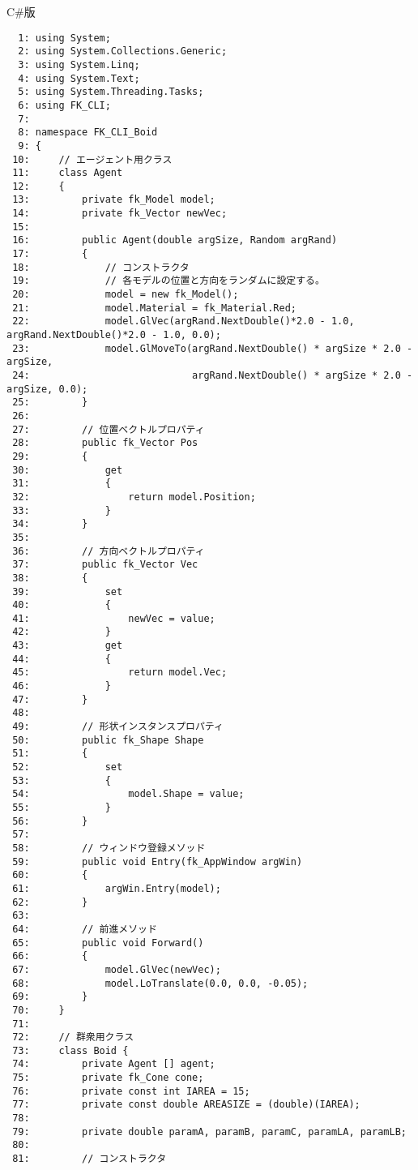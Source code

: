 \begin{center}
C\#版
\end{center}
\begin{breakbox}
\begin{small}
\begin{verbatim}
  1: using System;
  2: using System.Collections.Generic;
  3: using System.Linq;
  4: using System.Text;
  5: using System.Threading.Tasks;
  6: using FK_CLI;
  7: 
  8: namespace FK_CLI_Boid
  9: {
 10:     // エージェント用クラス
 11:     class Agent
 12:     {
 13:         private fk_Model model;
 14:         private fk_Vector newVec;
 15: 
 16:         public Agent(double argSize, Random argRand)
 17:         {
 18:             // コンストラクタ
 19:             // 各モデルの位置と方向をランダムに設定する。
 20:             model = new fk_Model();
 21:             model.Material = fk_Material.Red;
 22:             model.GlVec(argRand.NextDouble()*2.0 - 1.0, argRand.NextDouble()*2.0 - 1.0, 0.0);
 23:             model.GlMoveTo(argRand.NextDouble() * argSize * 2.0 - argSize,
 24:                            argRand.NextDouble() * argSize * 2.0 - argSize, 0.0);
 25:         }
 26: 
 27:         // 位置ベクトルプロパティ
 28:         public fk_Vector Pos
 29:         {
 30:             get
 31:             {
 32:                 return model.Position;
 33:             }
 34:         }
 35: 
 36:         // 方向ベクトルプロパティ
 37:         public fk_Vector Vec
 38:         {
 39:             set
 40:             {
 41:                 newVec = value;
 42:             }
 43:             get
 44:             {
 45:                 return model.Vec;
 46:             }
 47:         }
 48: 
 49:         // 形状インスタンスプロパティ
 50:         public fk_Shape Shape
 51:         {
 52:             set
 53:             {
 54:                 model.Shape = value;
 55:             }
 56:         }
 57: 
 58:         // ウィンドウ登録メソッド
 59:         public void Entry(fk_AppWindow argWin)
 60:         {
 61:             argWin.Entry(model);
 62:         }
 63: 
 64:         // 前進メソッド
 65:         public void Forward()
 66:         {
 67:             model.GlVec(newVec);
 68:             model.LoTranslate(0.0, 0.0, -0.05);
 69:         }
 70:     }
 71: 
 72:     // 群衆用クラス
 73:     class Boid {
 74:         private Agent [] agent;
 75:         private fk_Cone cone;
 76:         private const int IAREA = 15;
 77:         private const double AREASIZE = (double)(IAREA);
 78: 
 79:         private double paramA, paramB, paramC, paramLA, paramLB;
 80: 
 81:         // コンストラクタ

\end{verbatim}
\end{small}
\end{breakbox}
